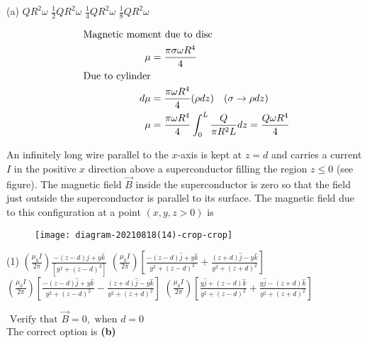 \begin{enumerate}
\begin{tasks}
		\task[\textbf{A.}](a) $Q R^{2} \omega$
		\task[\textbf{B.}]$\frac{1}{2} Q R^{2} \omega$
		\task[\textbf{C.}]$\frac{1}{4} Q R^{2} \omega$
		\task[\textbf{D.}]$\frac{1}{8} Q R^{2} \omega$
	\end{tasks}
	\begin{answer}
\begin{align*}
	\intertext{	Magnetic moment due to disc} 
\mu&=\frac{\pi \sigma \omega R^{4}}{4}\\
\text{	Due to cylinder}\\
 d \mu&=\frac{\pi \omega R^{4}}{4}(\rho d z) \quad(\sigma \rightarrow \rho d z)\\
\mu&=\frac{\pi \omega R^{4}}{4} \int_{0}^{L} \frac{Q}{\pi R^{2} L} d z=\frac{Q \omega R^{4}}{4}	
\end{align*}
	\end{answer}
	\begin{minipage}{\textwidth}
		\item An infinitely long wire parallel to the $x$-axis is kept at $z=d$ and carries a current $I$ in the positive $x$ direction above a superconductor filling the region $z \leq 0$ (see figure). The magnetic field $\vec{B}$ inside the superconductor is zero so that the field just outside the superconductor is parallel to its surface. The magnetic field due to this configuration at a point $(x, y, z>0)$ is
		\begin{figure}[H]
			\centering
			\texttt{[image: diagram-20210818(14)-crop-crop]}
			\caption{}
			\label{}
		\end{figure}
	\end{minipage}
	\begin{tasks}(1)
		\task[\textbf{A.}]$\left(\frac{\mu_{0} I}{2 \pi}\right) \frac{-(z-d) \hat{j}+y \hat{k}}{\left[y^{2}+(z-d)^{2}\right]}$
		\task[\textbf{B.}]$\left(\frac{\mu_{0} I}{2 \pi}\right)\left[\frac{-(z-d) \hat{j}+y \hat{k}}{y^{2}+(z-d)^{2}}+\frac{(z+d) \hat{j}-y \hat{k}}{y^{2}+(z+d)^{2}}\right]$
		\task[\textbf{C.}]$\left(\frac{\mu_{0} I}{2 \pi}\right)\left[\frac{-(z-d) \hat{j}+y \hat{k}}{y^{2}+(z-d)^{2}}-\frac{(z+d) \hat{j}-y \hat{k}}{y^{2}+(z+d)^{2}}\right]$
		\task[\textbf{D.}]$\left(\frac{\mu_{0} I}{2 \pi}\right)\left[\frac{y \hat{j}+(z-d) \hat{k}}{y^{2}+(z-d)^{2}}+\frac{y \hat{j}-(z+d) \hat{k}}{y^{2}+(z+d)^{2}}\right]$
	\end{tasks}
	\begin{answer}
		$\text { Verify that } \vec{B}=0, \text { when } d=0$\\
		The correct option is \textbf{(b)}	

\end{answer}
\end{enumerate}
